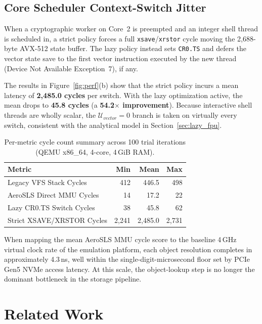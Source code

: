 \documentclass[sigconf]{acmart}
\begin{document}
\subsection{Core Scheduler Context-Switch Jitter}

When a cryptographic worker on Core~2 is preempted and an
integer shell thread is scheduled in, a strict policy forces a
full \texttt{xsave}/\texttt{xrstor} cycle moving the 2,688-byte
AVX-512 state buffer.  The lazy policy instead sets
\texttt{CR0.TS} and defers the vector state save to the first
vector instruction executed by the new thread (Device Not
Available Exception~7), if any.

The results in Figure~\ref{fig:perf}(b) show that the
strict policy incurs a mean latency of \textbf{2,485.0 cycles}
per switch.  With the lazy optimization active, the mean drops
to \textbf{45.8 cycles} (a \textbf{54.2$\times$ improvement}).
Because interactive shell threads are wholly scalar, the
$\mathcal{U}_{vector} = 0$ branch is taken on virtually every
switch, consistent with the analytical model in
Section~\ref{sec:lazy_fpu}.

\begin{table}[h]
\caption{Per-metric cycle count summary across 100 trial
  iterations (QEMU x86\_64, 4-core, 4\,GiB RAM).}
\label{tab:results}
\begin{tabular}{lrrr}
\toprule
\textbf{Metric}              & \textbf{Min} & \textbf{Mean} &
  \textbf{Max} \\
\midrule
Legacy VFS Stack Cycles      & 412   & 446.5  & 498   \\
AeroSLS Direct MMU Cycles    & 14    & 17.2   & 22    \\
\midrule
Lazy CR0.TS Switch Cycles    & 38    & 45.8   & 62    \\
Strict XSAVE/XRSTOR Cycles   & 2,241 & 2,485.0 & 2,731 \\
\bottomrule
\end{tabular}
\end{table}

When mapping the mean AeroSLS MMU cycle score to the baseline
4\,GHz virtual clock rate of the emulation platform, each
object resolution completes in approximately 4.3\,ns, well
within the single-digit-microsecond floor set by PCIe Gen5
NVMe access latency.  At this scale, the object-lookup step
is no longer the dominant bottleneck in the storage pipeline.

\section{Related Work}
\label{sec:related}
\end{document}
